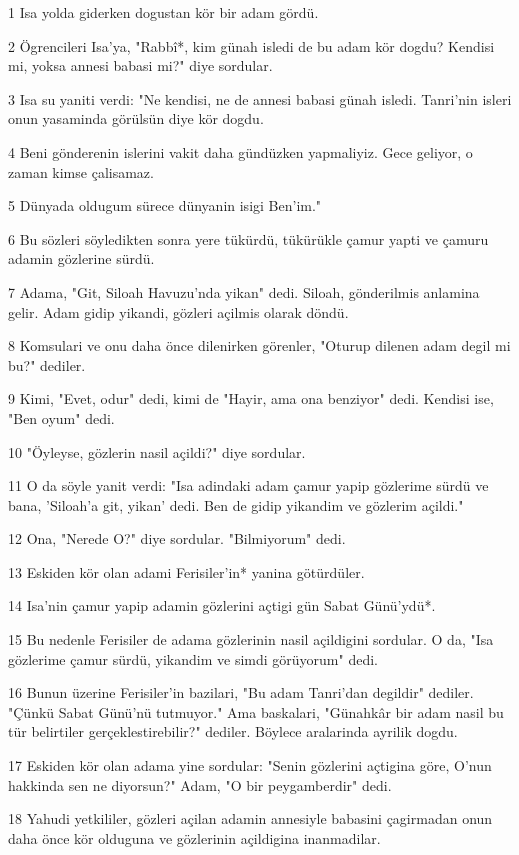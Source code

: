 \par 1 Isa yolda giderken dogustan kör bir adam gördü.
\par 2 Ögrencileri Isa'ya, "Rabbî*, kim günah isledi de bu adam kör dogdu? Kendisi mi, yoksa annesi babasi mi?" diye sordular.
\par 3 Isa su yaniti verdi: "Ne kendisi, ne de annesi babasi günah isledi. Tanri'nin isleri onun yasaminda görülsün diye kör dogdu.
\par 4 Beni gönderenin islerini vakit daha gündüzken yapmaliyiz. Gece geliyor, o zaman kimse çalisamaz.
\par 5 Dünyada oldugum sürece dünyanin isigi Ben'im."
\par 6 Bu sözleri söyledikten sonra yere tükürdü, tükürükle çamur yapti ve çamuru adamin gözlerine sürdü.
\par 7 Adama, "Git, Siloah Havuzu'nda yikan" dedi. Siloah, gönderilmis anlamina gelir. Adam gidip yikandi, gözleri açilmis olarak döndü.
\par 8 Komsulari ve onu daha önce dilenirken görenler, "Oturup dilenen adam degil mi bu?" dediler.
\par 9 Kimi, "Evet, odur" dedi, kimi de "Hayir, ama ona benziyor" dedi. Kendisi ise, "Ben oyum" dedi.
\par 10 "Öyleyse, gözlerin nasil açildi?" diye sordular.
\par 11 O da söyle yanit verdi: "Isa adindaki adam çamur yapip gözlerime sürdü ve bana, 'Siloah'a git, yikan' dedi. Ben de gidip yikandim ve gözlerim açildi."
\par 12 Ona, "Nerede O?" diye sordular. "Bilmiyorum" dedi.
\par 13 Eskiden kör olan adami Ferisiler'in* yanina götürdüler.
\par 14 Isa'nin çamur yapip adamin gözlerini açtigi gün Sabat Günü'ydü*.
\par 15 Bu nedenle Ferisiler de adama gözlerinin nasil açildigini sordular. O da, "Isa gözlerime çamur sürdü, yikandim ve simdi görüyorum" dedi.
\par 16 Bunun üzerine Ferisiler'in bazilari, "Bu adam Tanri'dan degildir" dediler. "Çünkü Sabat Günü'nü tutmuyor." Ama baskalari, "Günahkâr bir adam nasil bu tür belirtiler gerçeklestirebilir?" dediler. Böylece aralarinda ayrilik dogdu.
\par 17 Eskiden kör olan adama yine sordular: "Senin gözlerini açtigina göre, O'nun hakkinda sen ne diyorsun?" Adam, "O bir peygamberdir" dedi.
\par 18 Yahudi yetkililer, gözleri açilan adamin annesiyle babasini çagirmadan onun daha önce kör olduguna ve gözlerinin açildigina inanmadilar.
